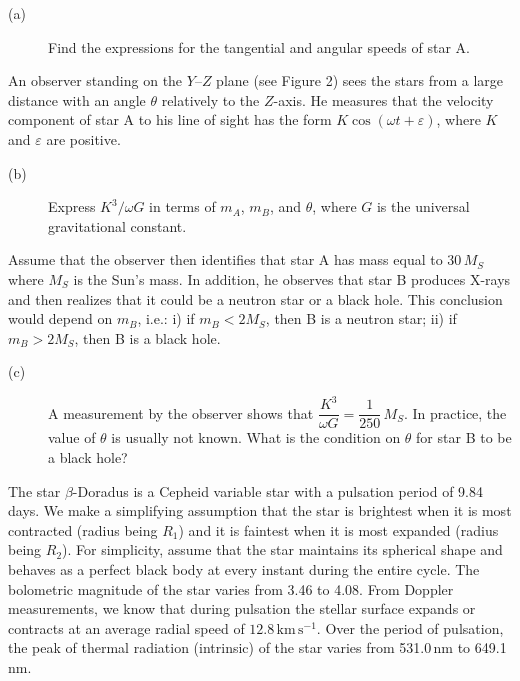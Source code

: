 \begin{description}
\item[(a)] Find the expressions for the tangential and angular speeds of
  star A.
\end{description}

An observer standing on the $Y$--$Z$ plane (see Figure 2) sees the stars from
a large distance with an angle $\theta$ relatively to the $Z$-axis. He
measures that the velocity component of star A to his line of sight has the
form $K\cos(\omega t + \varepsilon)$, where $K$ and $\varepsilon$ are
positive.

\begin{description}
\item[(b)] Express $K^3/\omega G$ in terms of $m_A$, $m_B$, and $\theta$,
  where $G$ is the universal gravitational constant.
\end{description}

Assume that the observer then identifies that star A has mass equal to
$30\,M_S$ where $M_S$ is the Sun's mass. In addition, he observes that star B
produces X-rays and then realizes that it could be a neutron star or a black
hole. This conclusion would depend on $m_B$, i.e.: i) if $m_B < 2M_S$, then B
is a neutron star; ii) if $m_B > 2M_S$, then B is a black hole.

\begin{description}
\item[(c)] A measurement by the observer shows that
  $\dfrac{K^3}{\omega G} = \dfrac{1}{250}\,M_S$. In practice, the value of
  $\theta$ is usually not known. What is the condition on $\theta$ for star B
  to be a black hole?
\end{description}

The star $\beta$-Doradus is a Cepheid variable star with a pulsation period
of 9.84 days. We make a simplifying assumption that the star is brightest
when it is most contracted (radius being $R_1$) and it is faintest when it is
most expanded (radius being $R_2$). For simplicity, assume that the star
maintains its spherical shape and behaves as a perfect black body at every
instant during the entire cycle. The bolometric magnitude of the star varies
from 3.46 to 4.08. From Doppler measurements, we know that during pulsation
the stellar surface expands or contracts at an average radial speed of
$12.8\,\mathrm{km\,s^{-1}}$. Over the period of pulsation, the peak of
thermal radiation (intrinsic) of the star varies from 531.0\,nm to
649.1\,nm.

